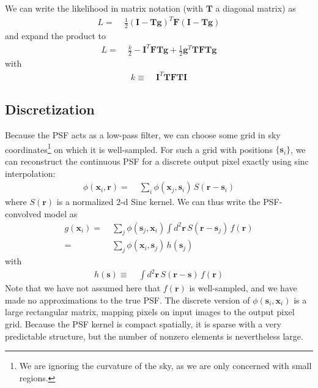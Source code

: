 \documentclass[10pt]{article}
\begin{document}
We can write the likelihood in matrix notation (with $\bm{T}$ a diagonal matrix) as
\begin{align}
L =\;& \frac{1}{2}
        \left(\bm{I} - \bm{T}\bm{g}\right)^T\!
        \bm{F}
        \left(\bm{I} - \bm{T}\bm{g}\right)
\end{align}
and expand the product to
\begin{align}
L =\;& \frac{k}{2} - \bm{I}^T\!\bm{F}\bm{T}\bm{g}
        + \frac{1}{2}\bm{g}^T\!\bm{T}\bm{F}\bm{T}\bm{g}
        \label{eqn:expanded-likelihood}
\end{align}
with
\begin{align}
k \equiv\;&
    \bm{I}^T\!\bm{T}\bm{F}\bm{T}\bm{I}
    \label{eqn:k-def}
\end{align}

\subsection{Discretization}
\label{sec:discretization}

Because the PSF acts as a low-pass filter, we can choose some grid in sky coordinates\footnote{We are ignoring the curvature of the sky, as we are only concerned with small regions.} on which it is well-sampled.  For such a grid with positions $\{\bm{s}_i\}$, we can reconstruct the continuous PSF for a discrete output pixel exactly using sinc interpolation:
\begin{align}
\phi(\bm{x}_i,\bm{r}) =\;& \sum_{i} \phi(\bm{x}_j,\bm{s}_i)\,
    S(\bm{r}-\bm{s}_i)
    \label{eqn:phi-interpolated}
\end{align}
where $S(\bm{r})$ is a normalized 2-d Sinc kernel.  We can thus write the PSF-convolved model as
\begin{align}
g(\bm{x}_i) =\;& \sum_{j} \phi(\bm{s}_j,\bm{x}_i)
    \int\! d^2 \bm{r} \, S(\bm{r}-\bm{s}_j) \, f(\bm{r}) \\
    =\;& \sum_{j} \phi(\bm{x}_i,\bm{s}_j) \, h(\bm{s}_j)
\end{align}
with
\begin{align}
h(\bm{s}) \equiv\;& \int\! d^2 \bm{r} \, S(\bm{r}-\bm{s}) \, f(\bm{r})
\end{align}
Note that we have not assumed here that $f(\bm{r})$ is well-sampled, and we have made no approximations to the true PSF.  The discrete version of $\phi(\bm{s}_i,\bm{x}_i)$ is a large rectangular matrix, mapping pixels on input images to the output pixel grid.  Because the PSF kernel is compact spatially, it is sparse with a very predictable structure, but the number of nonzero elements is nevertheless large.
\end{document}
